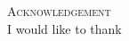 \begin{center}
                \textsc{\Large Acknowledgement}\\

		\vspace{2cm}
		I would like to thank

	\newpage	
\end{center}

